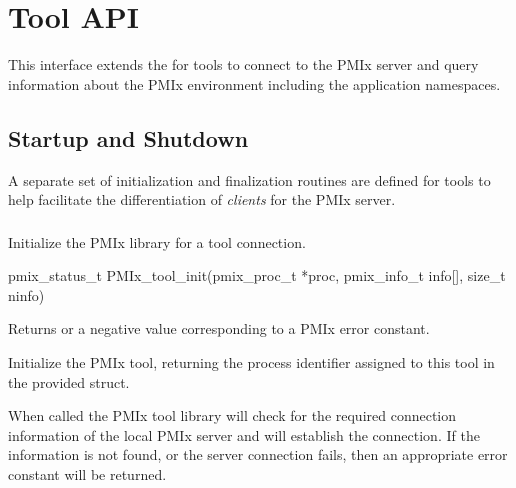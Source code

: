 \chapter{Tool API}
\label{chap:api_tool}

This interface extends the  for tools to connect to the \ac{PMIx} server and query information about the \ac{PMIx} environment including the application namespaces.

\section{Startup and Shutdown}

A separate set of initialization and finalization routines are defined for tools to help facilitate the differentiation of \emph{clients} for the \ac{PMIx} server.

\subsection{}

\summary

Initialize the \ac{PMIx} library for a tool connection.

\format

\cspecificstart
\begin{codepar}
pmix_status_t PMIx_tool_init(pmix_proc_t *proc,
                             pmix_info_t info[], size_t ninfo)
\end{codepar}
\cspecificend

\begin{arglist}
\end{arglist}

Returns  or a negative value corresponding to a PMIx error constant.

\descr

Initialize the PMIx tool, returning the process identifier assigned to this tool in the provided  struct.

When called the PMIx tool library will check for the required connection information of the local PMIx server and will establish the connection.
If the information is not found, or the server connection fails, then an appropriate error constant will be returned.

